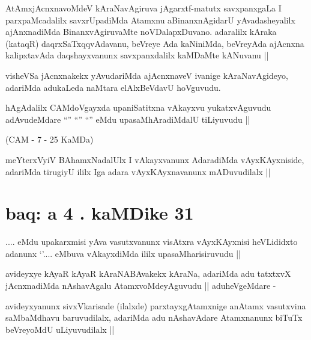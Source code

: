 \begin{artha}
AtAmxjAcnxnavoMdeV kAraNavAgiruva jAgarxtf-matutx savxpanxgaLa I
parxpaMcadalilx savxrUpadiMda Atamxnu aBinanxnAgidarU yAvadasheyalilx
ajAnxnadiMda BinanxvAgiruvaMte noVDalapxDuvano. adaralilx kAraka
(kataqR) daqrxSaTxqqvAdavanu, beVreye Ada kaNiniMda, beVreyAda
ajAcnxna kalipxtavAda daqshayxvanunx savxpanxdalilx kaMDaMte kANuvanu ||
\end{artha}


\begin{artha}
visheVSa jAcnxnakekx yAvudariMda ajAcnxnaveV ivanige kAraNavAgideyo,
adariMda adukaLeda naMtara elAlxBeVdavU hoVguvudu.
\end{artha}


\begin{artha}
hAgAdalilx CAMdoVgayxda upaniSatitxna vAkayxvu yukatxvAguvudu
adAvudeMdare ``\stext'' ``\stext'' ``\stext'' eMdu upasaMhAradiMdalU
tiLiyuvudu ||
\end{artha}

(CAM - 7 - 25 KaMDa)

\begin{artha}
meYterxVyiV BAhamxNadalUlx I vAkayxvanunx AdaradiMda vAyxKAyxniside,
adariMda tirugiyU ililx Iga adara vAyxKAyxnavanunx mADuvudilalx ||
\end{artha}

\section*{baq: a 4 . kaMDike 31}

\stext

\stext

\begin{artha}
\stext .... eMdu upakarxmisi yAva vasutxvanunx visAtxra vAyxKAyxnisi
heVLididxto adanunx `\stext'.... eMbuva vAkayxdiMda ililx
upasaMharisiruvudu ||
\end{artha}

\begin{artha}
avideyxye kAyaR kAyaR kAraNABAvakekx kAraNa, adariMda adu tatxtxvX
jAcnxnadiMda nAshavAgalu AtamxvoMdeyAguvudu || aduheVgeMdare -
\end{artha}

\begin{artha}
avideyxyanunx sivxVkarisade (ilalxde) parxtayxgAtamxnige anAtamx
vasutxvina saMbaMdhavu baruvudilalx, adariMda adu nAshavAdare
Atamxnanunx biTuTx beVreyoMdU uLiyuvudilalx ||
\end{artha}

